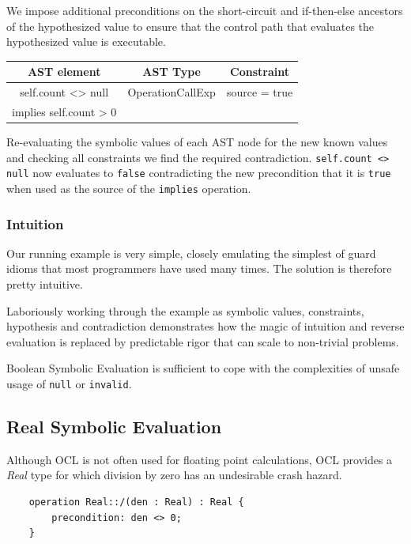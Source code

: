 \documentclass[
]{ceurart}
\begin{document}
We impose additional preconditions on the short-circuit and if-then-else ancestors of the hypothesized value to ensure that the control path that evaluates the hypothesized value is executable.

\begin{center}
	\begin{tabular}{|c|c||c|}
		\hline
		AST element & AST Type & Constraint \\
		\hline
		\hline
        self.count <> null & OperationCallExp & source = true \\
		implies self.count > 0 && \\
		\hline
	\end{tabular}
\end{center}

Re-evaluating the symbolic values of each AST node for the new known values and checking all constraints we find the required contradiction. \verb|self.count <> null| now evaluates to \verb|false| contradicting the new precondition that it is \verb|true| when used as the source of the \verb|implies| operation.

\subsubsection{Intuition}
 
Our running example is very simple, closely emulating the simplest of guard idioms that most programmers have used many times. The solution is therefore pretty intuitive.

Laboriously working through the example as symbolic values, constraints, hypothesis and contradiction demonstrates how the magic of intuition and reverse evaluation is replaced by predictable rigor that can scale to non-trivial problems.

Boolean Symbolic Evaluation is sufficient to cope with the complexities of unsafe usage of \verb|null| or \verb|invalid|.

\subsection{Real Symbolic Evaluation}

Although OCL is not often used for floating point calculations, OCL provides a \emph{Real} type for which division by zero has an undesirable crash hazard.

\begin{verbatim}
    operation Real::/(den : Real) : Real {
        precondition: den <> 0;
    }
\end{verbatim}
\end{document}
